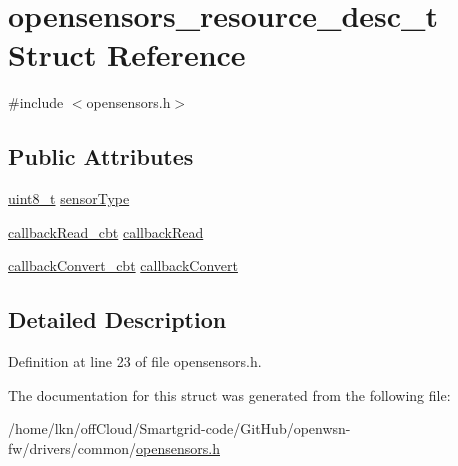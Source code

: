 \hypertarget{structopensensors__resource__desc__t}{}\section{opensensors\+\_\+resource\+\_\+desc\+\_\+t Struct Reference}
\label{structopensensors__resource__desc__t}


{\ttfamily \#include $<$opensensors.\+h$>$}

\subsection*{Public Attributes}
\begin{DoxyCompactItemize}
\item 
\hyperlink{_p_e___types_8h_aba7bc1797add20fe3efdf37ced1182c5}{uint8\+\_\+t} \hyperlink{group___open_sensors_gaf752996db289f7c2e59fccc591a2d07d}{sensor\+Type}
\item 
\hyperlink{sensors_8h_a4896998a8e1784ceb727ed0e8f459e47}{callback\+Read\+\_\+cbt} \hyperlink{group___open_sensors_ga1768cf6325dd5cd7caea6087f3b9f565}{callback\+Read}
\item 
\hyperlink{sensors_8h_a9f4f0fc901543c7425be6f83307c0ac2}{callback\+Convert\+\_\+cbt} \hyperlink{group___open_sensors_ga181017b594454ddb5e2346366984ee44}{callback\+Convert}
\end{DoxyCompactItemize}


\subsection{Detailed Description}


Definition at line 23 of file opensensors.\+h.



The documentation for this struct was generated from the following file\+:\begin{DoxyCompactItemize}
\item 
/home/lkn/off\+Cloud/\+Smartgrid-\/code/\+Git\+Hub/openwsn-\/fw/drivers/common/\hyperlink{opensensors_8h}{opensensors.\+h}\end{DoxyCompactItemize}
